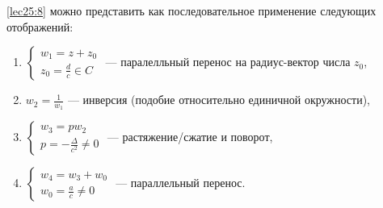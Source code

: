 \documentclass[../../main.tex]{subfiles}
\begin{document}
\begin{enumerate}
	\eqref{lec25:8} можно представить как последовательное применение следующих отображений:
		 \begin{enumerate}
	 	\item 
	 	$ \begin{cases} 
 	 	w_1 = z + z_0\\
  	  	z_0 = \frac{d}{c} \in C
		\end{cases}$ --- паралелльный перенос на радиус-вектор числа $z_0$,
		\item $w_2 = \frac{1}{w_1}$ --- инверсия (подобие относительно единичной окружности),
		\item 
		$ \begin{cases} 
 	 	w_3 = pw_2\\
  	  	p = -\frac{\Delta}{c^2} \ne 0
		\end{cases}$ --- растяжение/сжатие и поворот,
		\item 
		$ \begin{cases} 
 	 	w_4 = w_3 + w_0\\
  	  	w_0 = \frac{a}{c} \ne 0
		\end{cases}$ --- параллельный перенос.
	 	 \end{enumerate}
 \end{enumerate}
\end{document}
